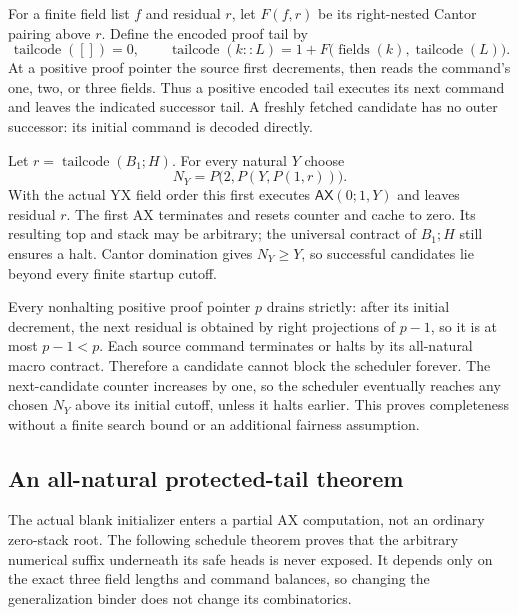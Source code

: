 For a finite field list $f$ and residual $r$, let $F(f,r)$ be its
right-nested Cantor pairing above $r$.  Define the encoded proof tail by
\[
 \operatorname{tailcode}([])=0,\qquad
 \operatorname{tailcode}(k::L)
   =1+F\bigl(\operatorname{fields}(k),\operatorname{tailcode}(L)\bigr).
\]
At a positive proof pointer the source first decrements, then reads the
command's one, two, or three fields.  Thus a positive encoded tail
executes its next command and leaves the indicated successor tail.
A freshly fetched candidate has no outer successor: its initial command
is decoded directly.

Let $r=\operatorname{tailcode}(B_1;H)$.  For every natural $Y$ choose
\[
                 N_Y=P\bigl(2,P(Y,P(1,r))\bigr).
 \tag{Cofinal}
\]
With the actual YX field order this first executes
$\mathsf{AX}(0;1,Y)$ and leaves residual $r$.  The first AX terminates
and resets counter and cache to zero.  Its resulting top and stack may
be arbitrary; the universal contract of $B_1;H$ still ensures a halt.
Cantor domination gives $N_Y\ge Y$, so successful candidates lie beyond
every finite startup cutoff.

Every nonhalting positive proof pointer $p$ drains strictly: after its
initial decrement, the next residual is obtained by right projections
of $p-1$, so it is at most $p-1<p$.  Each source command terminates or
halts by its all-natural macro contract.  Therefore a candidate cannot
block the scheduler forever.  The next-candidate counter increases by
one, so the scheduler eventually reaches any chosen $N_Y$ above its
initial cutoff, unless it halts earlier.  This proves completeness
without a finite search bound or an additional fairness assumption.

\subsection{An all-natural protected-tail theorem}

The actual blank initializer enters a partial AX computation, not an
ordinary zero-stack root.  The following schedule theorem proves that
the arbitrary numerical suffix underneath its safe heads is never exposed.
It depends only on the exact three field lengths and command balances,
so changing the generalization binder does not change its combinatorics.

